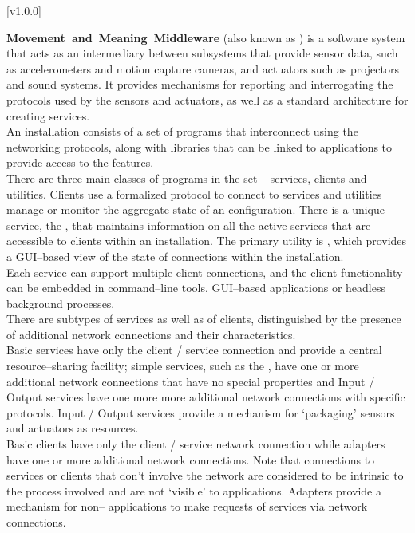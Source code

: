 [v1.0.0]

\textbf{Movement~and~Meaning~Middleware} (also known as \mplusm{}) is a software system
that acts as an intermediary between subsystems that provide sensor data, such as
accelerometers and motion capture cameras, and actuators such as projectors and sound
systems.
It provides mechanisms for reporting and interrogating the protocols used by the sensors
and actuators, as well as a standard architecture for creating services.\\

An \mplusm{} installation consists of a set of programs that interconnect using the
 networking
protocols, along with libraries that can be linked to applications to provide access to
the \mplusm{} features.\\

There are three main classes of programs in the set -- services, clients and utilities.
Clients use a formalized protocol to connect to services and utilities manage or monitor
the aggregate state of an \mplusm{} configuration.
There is a unique service, the , that
maintains information on all the active services that are accessible to clients within an
\mplusm{} installation. The primary utility is
, which provides a GUI--based view of the
state of connections within the installation.\\

Each service can support multiple client connections, and the client functionality can be
embedded in command--line tools, GUI--based applications or headless background
processes.\\

There are subtypes of services as well as of clients, distinguished by the presence of
additional \yarp{} network connections and their characteristics.\\

Basic services have only the client / service \yarp{} connection and provide a central
resource--sharing facility; simple services, such as the
, have one or more additional \yarp{}
network connections that have no special properties and Input / Output services have one
more more additional \yarp{} network connections with specific protocols.
Input / Output services provide a mechanism for `packaging' sensors and actuators as
\mplusm{} resources.\\

Basic clients have only the client / service \yarp{} network connection while adapters
have one or more additional \yarp{} network connections. Note that connections to services
or clients that don't involve the \yarp{} network are considered to be intrinsic to the
process involved and are not `visible' to \mplusm{} applications. Adapters provide a
mechanism for non--\mplusm{} applications to make requests of \mplusm{} services via
\yarp{} network connections.

\primaryEnd{}
